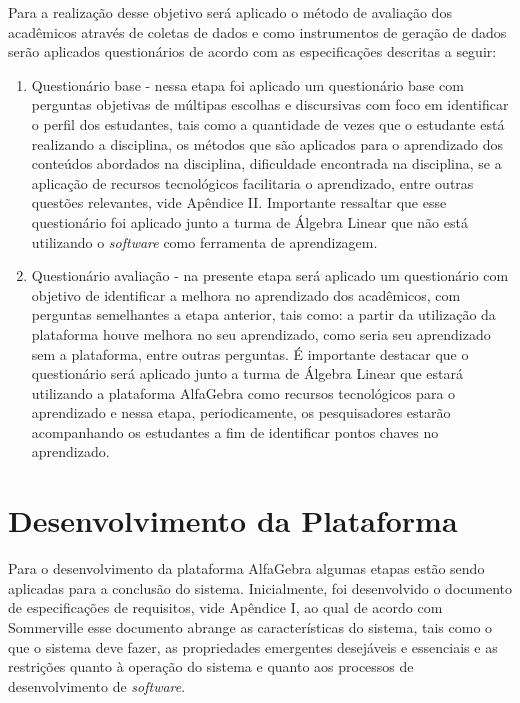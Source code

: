 Para a realização desse objetivo será aplicado o método de avaliação dos acadêmicos através de coletas de dados e como instrumentos de geração de dados serão aplicados questionários de acordo com as especificações descritas a seguir:

\begin{enumerate}
    \item Questionário base - nessa etapa foi aplicado um questionário base com perguntas objetivas de múltipas escolhas e discursivas com foco em identificar o perfil dos estudantes, tais como a quantidade de vezes que o estudante está realizando a disciplina, os métodos que são aplicados para o aprendizado dos conteúdos abordados na disciplina, dificuldade encontrada na disciplina, se a aplicação de recursos tecnológicos facilitaria o aprendizado, entre outras questões relevantes, vide Apêndice II. Importante ressaltar que esse questionário foi aplicado junto a turma de Álgebra Linear que não está utilizando o \textit{software} como ferramenta de aprendizagem.
    
    \item Questionário avaliação - na presente etapa será aplicado um questionário com objetivo de identificar a melhora no aprendizado dos acadêmicos, com perguntas semelhantes a etapa anterior, tais como: a partir da utilização da plataforma houve melhora no seu aprendizado, como seria seu aprendizado sem a plataforma, entre outras perguntas. É importante destacar que o questionário será aplicado junto a turma de Álgebra Linear que estará utilizando a plataforma AlfaGebra como recursos tecnológicos para o aprendizado e nessa etapa, periodicamente, os pesquisadores estarão acompanhando os estudantes a fim de identificar pontos chaves no aprendizado.
\end{enumerate}


\section{Desenvolvimento da Plataforma}
\noindent Para o desenvolvimento da plataforma AlfaGebra algumas etapas estão sendo aplicadas para a conclusão do sistema. Inicialmente, foi desenvolvido o documento de especificações de requisitos, vide Apêndice I, ao qual de acordo com Sommerville \cite{2013:Sommerville} esse documento abrange as características do sistema, tais como o que o sistema deve fazer, as propriedades emergentes desejáveis e essenciais e as restrições quanto à operação do sistema e quanto aos processos de desenvolvimento de \textit{software}. 

